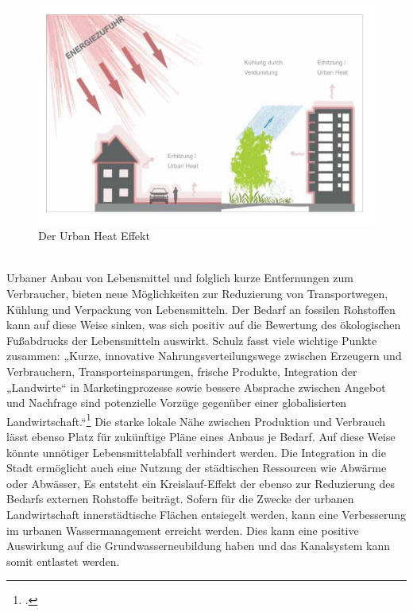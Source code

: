 \documentclass{scrartcl}
\begin{document}
\begin{figure}[htbp]
\centering
\includegraphics[width=14cm]{image_folder/urbanheat.png}
\caption{Der Urban Heat Effekt}
\label{fig:urbanheateffekt}
\end{figure}
\\
Urbaner Anbau von Lebensmittel und folglich kurze Entfernungen zum Verbraucher, bieten neue Möglichkeiten zur Reduzierung von Transportwegen, Kühlung und Verpackung von Lebensmitteln. Der Bedarf an fossilen Rohstoffen kann auf diese Weise sinken, was sich positiv auf die Bewertung des ökologischen Fußabdrucks der Lebensmitteln auswirkt. Schulz fasst viele wichtige Punkte zusammen: „Kurze, innovative Nahrungsverteilungswege zwischen Erzeugern und Verbrauchern, Transporteinsparungen, frische Produkte, Integration der „Landwirte“ in Marketingprozesse sowie bessere Absprache zwischen Angebot und Nachfrage sind potenzielle Vorzüge gegenüber einer globalisierten Landwirtschaft.“\footcite[S.10]{Schulz2013UrbaneLandmanagements} Die starke lokale Nähe zwischen Produktion und Verbrauch lässt ebenso Platz für zukünftige Pläne eines Anbaus je Bedarf. Auf diese Weise könnte unnötiger Lebensmittelabfall verhindert werden. Die Integration in die Stadt ermöglicht auch eine Nutzung der städtischen Ressourcen wie Abwärme oder Abwässer, Es entsteht ein Kreislauf-Effekt der ebenso zur Reduzierung des Bedarfs externen Rohstoffe beiträgt.
Sofern für die Zwecke der urbanen Landwirtschaft innerstädtische Flächen entsiegelt werden, kann eine Verbesserung im urbanen Wassermanagement erreicht werden. Dies kann eine positive Auswirkung auf die Grundwasserneubildung haben und das Kanalsystem kann somit entlastet werden.  
  
\end{document}
